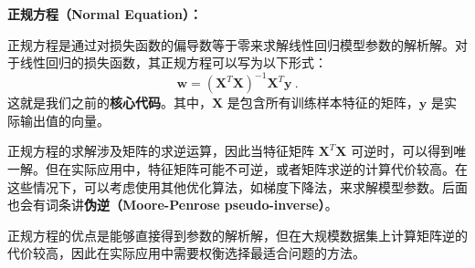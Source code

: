 \textbf{正规方程（Normal Equation）：}

正规方程是通过对损失函数的偏导数等于零来求解线性回归模型参数的解析解。对于线性回归的损失函数，其正规方程可以写为以下形式：
\begin{equation}
\mathbf{w} = (\mathbf{X}^T \mathbf{X})^{-1} \mathbf{X}^T \mathbf{y}~.
\end{equation}
这就是我们之前的\textbf{核心代码}。其中，$\mathbf{X}$ 是包含所有训练样本特征的矩阵，$\mathbf{y}$ 是实际输出值的向量。

正规方程的求解涉及矩阵的求逆运算，因此当特征矩阵 $\mathbf{X}^T \mathbf{X}$ 可逆时，可以得到唯一解。但在实际应用中，特征矩阵可能不可逆，或者矩阵求逆的计算代价较高。在这些情况下，可以考虑使用其他优化算法，如梯度下降法，来求解模型参数。后面也会有词条讲\textbf{伪逆（Moore-Penrose pseudo-inverse）}。

正规方程的优点是能够直接得到参数的解析解，但在大规模数据集上计算矩阵逆的代价较高，因此在实际应用中需要权衡选择最适合问题的方法。

